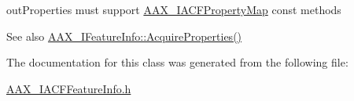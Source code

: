 {\ttfamily out\+Properties} must support \mbox{\hyperlink{a01745}{A\+A\+X\+\_\+\+I\+A\+C\+F\+Property\+Map}} const methods

\begin{DoxySeeAlso}{See also}
\mbox{\hyperlink{a01829_ab74a4576cd4e87baa01d046dfa0c752e}{A\+A\+X\+\_\+\+I\+Feature\+Info\+::\+Acquire\+Properties()}} 
\end{DoxySeeAlso}


The documentation for this class was generated from the following file\+:\begin{DoxyCompactItemize}
\item 
\mbox{\hyperlink{a00533}{A\+A\+X\+\_\+\+I\+A\+C\+F\+Feature\+Info.\+h}}\end{DoxyCompactItemize}
